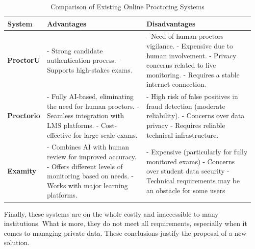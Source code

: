 \documentclass[12pt,a4paper]{article}
\begin{document}
\begin{table}[H]
    \centering
    \renewcommand{\arraystretch}{1.3}
    \begin{tabular}{|l|p{6cm}|p{6cm}|}
        \hline
        \textbf{System} & \textbf{Advantages} & \textbf{Disadvantages} \\
        \hline
        \textbf{ProctorU} & 
        - Strong candidate authentication process. \newline
        - Supports high-stakes exams. 
        & 
        - Need of human proctors vigilance. \newline
        - Expensive due to human involvement. \newline
        - Privacy concerns related to live monitoring. \newline
        - Requires a stable internet connection. \\
        \hline
        \textbf{Proctorio} & - Fully AI-based, eliminating the need for human proctors. \newline
        - Seamless integration with LMS platforms. \newline
        - Cost-effective for large-scale exams. 
        & - High risk of false positives in fraud detection (moderate reliability). \newline
        - Concerns over data privacy \newline
        - Requires reliable technical infrastructure. \\
        \hline
        \textbf{Examity} & - Combines AI with human review for improved accuracy. \newline
        - Offers different levels of monitoring based on needs. \newline
        - Works with major learning platforms. 
        & - Expensive (particularly for fully monitored exams) \newline
        - Concerns over student data security \newline
        - Technical requirements may be an obstacle for some users \\
        \hline
    \end{tabular}
    \caption{Comparison of Existing Online Proctoring Systems}
\end{table}

\noindent Finally, these systems are on the whole costly and inaccessible to many institutions. What is more, they do not meet all requirements, especially when it comes to managing private data. These conclusions justify the proposal of a new solution.
\end{document}
